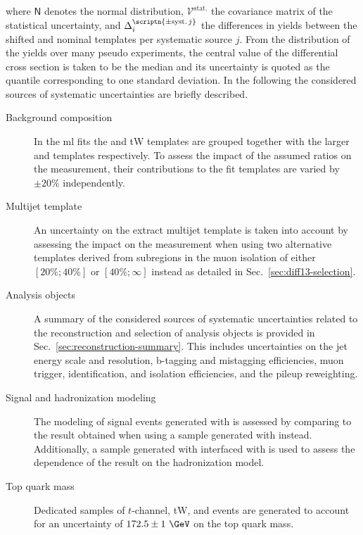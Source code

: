 where $\mathsf{N}$ denotes the normal distribution, $\mathcal{V}^\mathrm{stat.}$ the covariance matrix of the statistical uncertainty, and $\Delta^\scriptn{\mathrm{\pm syst.\,}j}_{i}$ the differences in yields between the shifted and nominal templates per systematic source $j$. From the distribution of the yields over many pseudo experiments, the central value of the differential cross section is taken to be the median and its uncertainty is quoted as the quantile corresponding to one standard deviation. In the following the considered sources of systematic uncertainties are briefly described.

\begin{description}
\item[Background composition] In the \gls{ml} fits the \zjets and tW templates are grouped together with the larger \wjets and \ttbar templates respectively. To assess the impact of the assumed ratios on the measurement, their contributions to the fit templates are varied by $\pm20\%$ independently.
 
\item[Multijet template] An uncertainty on the extract multijet template is taken into account by assessing the impact on the measurement when using two alternative templates derived from subregions in the muon isolation of either $[20\%; 40\%]$ or $[40\%; \infty]$ instead as detailed in Sec.~\ref{sec:diff13-selection}.

\item[Analysis objects] A summary of the considered sources of systematic uncertainties related to the reconstruction and selection of analysis objects is provided in Sec.~\ref{sec:reconstruction-summary}. This includes uncertainties on the jet energy scale and resolution, b-tagging and mistagging efficiencies, muon trigger, identification, and isolation efficiencies, and the pileup reweighting.

\item[Signal and hadronization modeling] The modeling of signal events generated with \MGAMC is assessed by comparing to the result obtained when using a sample generated with \POWHEG instead. Additionally, a sample generated with \MGAMC interfaced with \HERWIG is used to assess the dependence of the result on the hadronization model.

\item[Top quark mass] Dedicated samples of $t$-channel, tW, and \ttbar events are generated to account for an uncertainty of $172.5\pm1~\GeV$ on the top quark mass.


\end{description}

